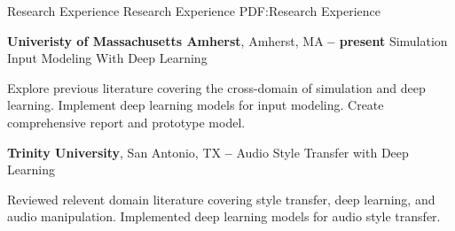 \Section
{Research Experience}
{Research Experience}
{PDF:Research Experience}

\Entry
\textbf{Univeristy of Massachusetts Amherst},
Amherst, MA 
\dotfill
\textbf{ -- present}
\Gap
Simulation Input Modeling With Deep Learning
\begin{Detail}
    \SubBulletItem
    Explore previous literature covering the cross-domain of simulation and deep learning.
    \SubBulletItem
    Implement deep learning models for input modeling.
    \SubBulletItem
    Create comprehensive report and prototype model.
\end{Detail}

\BigGap
\Entry
\textbf{Trinity University},
San Antonio, TX
\dotfill
\textbf{ -- }
\Gap
Audio Style Transfer with Deep Learning
\begin{Detail}
    \SubBulletItem
    Reviewed relevent domain literature covering style transfer, deep learning, and audio manipulation.
    \SubBulletItem
    Implemented deep learning models for audio style transfer.
\end{Detail}
